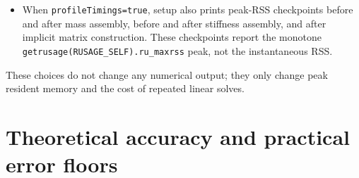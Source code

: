 \documentclass[11pt,a4paper]{article}
\newcommand{\code}[1]{\texttt{\small #1}}
\newcommand{\Aimp}{\mathbf{A}}
\newcommand{\Bimp}{\mathbf{B}}
\begin{document}
\begin{itemize}
allocation: \code{M\_ARENA\_MAX} is set to 2 to prevent the OpenMP ODE thread
pool from forcing dozens of arenas, \code{M\_MMAP\_THRESHOLD} and
\code{M\_TRIM\_THRESHOLD} are lowered to 64\,KiB so that mid-sized Eigen
temporaries during the LRE QR factorisations are placed in \code{mmap}'d
regions that are returned to the OS on free. When
\code{memoryOptimizationTrimHeap=true} and the memory optimisation mode is
effective, \code{malloc\_trim(0)} is called after the mass-matrix assembly,
after the stiffness-matrix assembly, and after $\Aimp/\Bimp$ are built; this
releases the heap padding left behind by the very large number of small Eigen
allocations performed during LRE setup.
\item When \code{profileTimings=true}, setup also prints peak-RSS checkpoints
before and after mass assembly, before and after stiffness assembly, and after
implicit matrix construction. These checkpoints report the monotone
\code{getrusage(RUSAGE\_SELF).ru\_maxrss} peak, not the instantaneous RSS.
\end{itemize}
These choices do not change any numerical output; they only change peak
resident memory and the cost of repeated linear solves.

\section{Theoretical accuracy and practical error floors}
\end{document}
